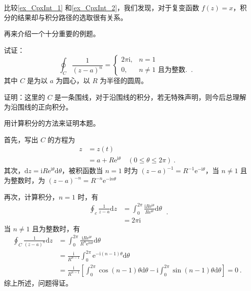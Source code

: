 比较\autoref{ex_CpxInt_1} 和\autoref{ex_CpxInt_2}，我们发现，对于复变函数 $f(z)=x$，积分的结果却与积分路径的选取很有关系。

再来介绍一个十分重要的例题。

\begin{example}{}
试证：
\begin{equation}
\oint_{C} \frac{1}{(z-a)^{n}}=\left\{\begin{array}{ll}2 \pi \mathrm{i}, & n=1 \\ 0, & n \neq 1 \text { 且为整数. }~.\end{array}\right.
\end{equation}
其中 $C$ 是为以 $a $ 为圆心，以 $R $ 为半径的圆周。

证明：这里的 $C $ 是一条围线，对于沿围线的积分，若无特殊声明，则今后总理解为沿围线的正向积分。

用计算积分的方法来证明本题。

首先，写出 $C $ 的方程为
\begin{equation}
\begin{aligned} z &=z(t) \\ &=a+R \mathrm{e}^{\mathrm{i} \theta} \quad(0 \leqslant \theta \leqslant 2 \pi) ~.\end{aligned}
\end{equation}
其次，$\mathrm{d} z=\mathrm{i} R \mathrm{e}^{\mathrm{i} \theta} \mathrm{d} \theta$，被积函数当 $n =1$ 时为 $(z-a)^{-1}=R^{-1} \mathrm{e}^{-\mathrm{i} \theta}$，当 $n \ne 1$ 且为整数时，为 $(z-a)^{-n}=R^{-n} \mathrm{e}^{-\mathrm{i} n \theta}$

再次，计算积分，$n=1$ 时，有
\begin{equation}
\begin{aligned} \oint_{c} \frac{1}{z-a} \mathrm{d} z &=\int_{0}^{2 \pi} \frac{\mathrm{i} R \mathrm{e}^{\mathrm{i} \theta}}{R \mathrm{e}^{\mathrm{i} \theta}} \mathrm{d} \theta \\ &=2 \pi \mathrm{i} \end{aligned}~.
\end{equation}
当 $n \neq 1$ 且为整数时，有
\begin{equation}
\begin{aligned} \oint_{C} \frac{1}{(z-a)^{n}} \mathrm{d} z &=\int_{0}^{2 \pi} \frac{\mathrm{i} R \mathrm{e}^{\mathrm{i} \theta}}{R^{n} \mathrm{e}^{\mathrm{i} n \theta}} \mathrm{d} \theta \\ &=\frac{\mathrm{i}}{R^{n-1}} \int_{0}^{2 \pi} \mathrm{e}^{-\mathrm{i}(n-1) \theta} \mathrm{d} \theta \\ &=\frac{\mathrm{i}}{R^{n-1}}\left[\int_{0}^{2 \pi} \cos (n-1) \theta \mathrm{d} \theta-\mathrm{i} \int_{0}^{2 \pi} \sin (n-1) \theta \mathrm{d} \theta\right]=0~. \end{aligned}
\end{equation}
综上所述，问题得证。
\end{example}

